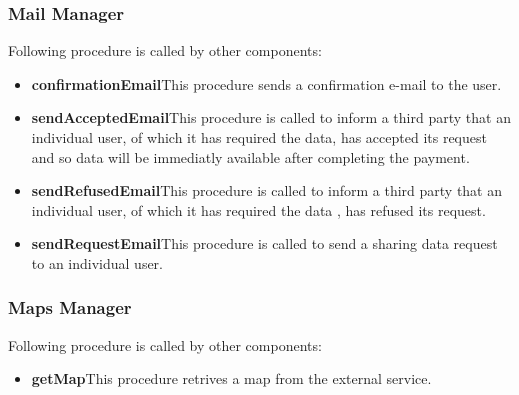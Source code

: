 \subsubsection{Mail Manager}
Following procedure is called by other components:
\begin{itemize}
  \item \textbf{confirmationEmail}\quad This procedure sends a confirmation e-mail to the user.
  \item \textbf{sendAcceptedEmail}\quad This procedure is called to inform a third party that an individual user, of which it has required the data, has accepted its request and so data will be immediatly available after completing the payment.
  \item \textbf{sendRefusedEmail}\quad This procedure is called to inform a third party that an individual user, of which it has required the data , has refused its request.
  \item \textbf{sendRequestEmail}\quad This procedure is called to send a sharing data request to an individual user.
\end{itemize}

\subsubsection{Maps Manager}
Following procedure is called by other components:
\begin{itemize}
  \item \textbf{getMap}\quad This procedure retrives a map from the external service.
\end{itemize}

